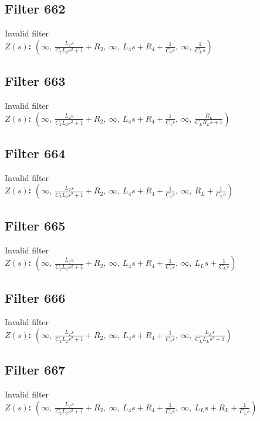 \documentclass{article}
\begin{document}
\subsection*{Filter 662}
Invalid filter \\ 
\textbf{$Z(s)$:} $\left( \infty, \  \frac{L_{2} s}{C_{2} L_{2} s^{2} + 1} + R_{2}, \  \infty, \  L_{4} s + R_{4} + \frac{1}{C_{4} s}, \  \infty, \  \frac{1}{C_{L} s}\right)$ \\ 
\subsection*{Filter 663}
Invalid filter \\ 
\textbf{$Z(s)$:} $\left( \infty, \  \frac{L_{2} s}{C_{2} L_{2} s^{2} + 1} + R_{2}, \  \infty, \  L_{4} s + R_{4} + \frac{1}{C_{4} s}, \  \infty, \  \frac{R_{L}}{C_{L} R_{L} s + 1}\right)$ \\ 
\subsection*{Filter 664}
Invalid filter \\ 
\textbf{$Z(s)$:} $\left( \infty, \  \frac{L_{2} s}{C_{2} L_{2} s^{2} + 1} + R_{2}, \  \infty, \  L_{4} s + R_{4} + \frac{1}{C_{4} s}, \  \infty, \  R_{L} + \frac{1}{C_{L} s}\right)$ \\ 
\subsection*{Filter 665}
Invalid filter \\ 
\textbf{$Z(s)$:} $\left( \infty, \  \frac{L_{2} s}{C_{2} L_{2} s^{2} + 1} + R_{2}, \  \infty, \  L_{4} s + R_{4} + \frac{1}{C_{4} s}, \  \infty, \  L_{L} s + \frac{1}{C_{L} s}\right)$ \\ 
\subsection*{Filter 666}
Invalid filter \\ 
\textbf{$Z(s)$:} $\left( \infty, \  \frac{L_{2} s}{C_{2} L_{2} s^{2} + 1} + R_{2}, \  \infty, \  L_{4} s + R_{4} + \frac{1}{C_{4} s}, \  \infty, \  \frac{L_{L} s}{C_{L} L_{L} s^{2} + 1}\right)$ \\ 
\subsection*{Filter 667}
Invalid filter \\ 
\textbf{$Z(s)$:} $\left( \infty, \  \frac{L_{2} s}{C_{2} L_{2} s^{2} + 1} + R_{2}, \  \infty, \  L_{4} s + R_{4} + \frac{1}{C_{4} s}, \  \infty, \  L_{L} s + R_{L} + \frac{1}{C_{L} s}\right)$ \\ 
\end{document}
